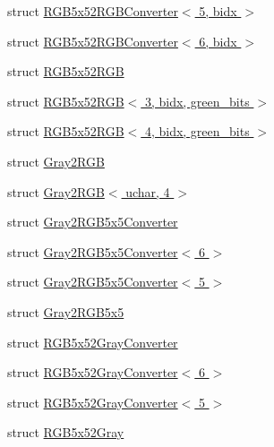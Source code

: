 \begin{DoxyCompactItemize}
\item 
struct \hyperlink{structcv_1_1gpu_1_1device_1_1color__detail_1_1RGB5x52RGBConverter_3_015_00_01bidx_01_4}{R\-G\-B5x52\-R\-G\-B\-Converter$<$ 5, bidx $>$}
\item 
struct \hyperlink{structcv_1_1gpu_1_1device_1_1color__detail_1_1RGB5x52RGBConverter_3_016_00_01bidx_01_4}{R\-G\-B5x52\-R\-G\-B\-Converter$<$ 6, bidx $>$}
\item 
struct \hyperlink{structcv_1_1gpu_1_1device_1_1color__detail_1_1RGB5x52RGB}{R\-G\-B5x52\-R\-G\-B}
\item 
struct \hyperlink{structcv_1_1gpu_1_1device_1_1color__detail_1_1RGB5x52RGB_3_013_00_01bidx_00_01green__bits_01_4}{R\-G\-B5x52\-R\-G\-B$<$ 3, bidx, green\-\_\-bits $>$}
\item 
struct \hyperlink{structcv_1_1gpu_1_1device_1_1color__detail_1_1RGB5x52RGB_3_014_00_01bidx_00_01green__bits_01_4}{R\-G\-B5x52\-R\-G\-B$<$ 4, bidx, green\-\_\-bits $>$}
\item 
struct \hyperlink{structcv_1_1gpu_1_1device_1_1color__detail_1_1Gray2RGB}{Gray2\-R\-G\-B}
\item 
struct \hyperlink{structcv_1_1gpu_1_1device_1_1color__detail_1_1Gray2RGB_3_01uchar_00_014_01_4}{Gray2\-R\-G\-B$<$ uchar, 4 $>$}
\item 
struct \hyperlink{structcv_1_1gpu_1_1device_1_1color__detail_1_1Gray2RGB5x5Converter}{Gray2\-R\-G\-B5x5\-Converter}
\item 
struct \hyperlink{structcv_1_1gpu_1_1device_1_1color__detail_1_1Gray2RGB5x5Converter_3_016_01_4}{Gray2\-R\-G\-B5x5\-Converter$<$ 6 $>$}
\item 
struct \hyperlink{structcv_1_1gpu_1_1device_1_1color__detail_1_1Gray2RGB5x5Converter_3_015_01_4}{Gray2\-R\-G\-B5x5\-Converter$<$ 5 $>$}
\item 
struct \hyperlink{structcv_1_1gpu_1_1device_1_1color__detail_1_1Gray2RGB5x5}{Gray2\-R\-G\-B5x5}
\item 
struct \hyperlink{structcv_1_1gpu_1_1device_1_1color__detail_1_1RGB5x52GrayConverter}{R\-G\-B5x52\-Gray\-Converter}
\item 
struct \hyperlink{structcv_1_1gpu_1_1device_1_1color__detail_1_1RGB5x52GrayConverter_3_016_01_4}{R\-G\-B5x52\-Gray\-Converter$<$ 6 $>$}
\item 
struct \hyperlink{structcv_1_1gpu_1_1device_1_1color__detail_1_1RGB5x52GrayConverter_3_015_01_4}{R\-G\-B5x52\-Gray\-Converter$<$ 5 $>$}
\item 
struct \hyperlink{structcv_1_1gpu_1_1device_1_1color__detail_1_1RGB5x52Gray}{R\-G\-B5x52\-Gray}

\end{DoxyCompactItemize}
